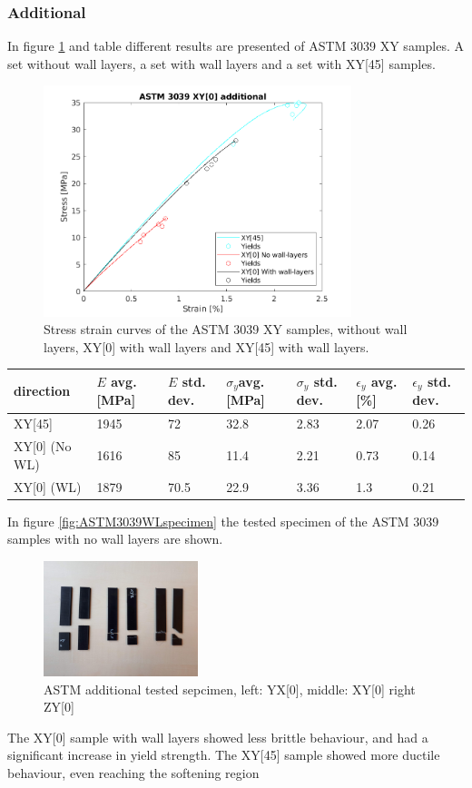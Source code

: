 \subsubsection{Additional} 
In figure \ref{fig:ASTM3039WLresults} and table \label{tab:additionalresults} different results are presented of ASTM 3039 XY samples. A set without wall layers, a set with wall layers and a set with XY[45] samples.
\begin{figure}[H]
    \centering
    \includegraphics[width=0.80\textwidth]{chapter_5_Experimentaltesting/figures/ASTMWLTensiletests.png}
    \caption{Stress strain curves of the ASTM 3039 XY samples, without wall layers, XY[0] with wall layers and XY[45] with wall layers.}
    \label{fig:ASTM3039WLresults}
\end{figure}
\begin{tabular}{ |p{2.5cm}||p{1cm}|p{1cm}|p{1cm}|p{1cm}|p{1cm}|p{1cm}|  }
 \hline
direction & $E$ avg. [MPa] & $E$ std. dev. & $\sigma_y$avg. [MPa] & $\sigma_y$ std. dev. & $\epsilon_y$ avg. [\%] & $\epsilon_y$   std. dev. \\
 \hline
XY[45] & 1945 & 72 & 32.8 & 2.83 & 2.07 & 0.26 \\
XY[0] (No WL) & 1616 & 85 & 11.4 & 2.21 & 0.73 & 0.14 \\
XY[0] (WL)& 1879 & 70.5 & 22.9 & 3.36 & 1.3 & 0.21\\
 \hline
\end{tabular}
     \label{tab:additionalresults}

In figure \ref{fig:ASTM3039WLspecimen} the tested specimen of the ASTM 3039 samples with no wall layers are shown.
\begin{figure}[H]
    \centering
    \includegraphics[width=0.40\textwidth]{chapter_5_Experimentaltesting/figures/imageASTMadd.jpg}
    \caption{ASTM additional tested sepcimen, left: YX[0], middle: XY[0] right ZY[0]}
    \label{fig:ASTM3039addspecimen}
\end{figure}
The XY[0] sample with wall layers showed less brittle behaviour, and had a significant increase in yield strength. The XY[45] sample showed  more ductile behaviour, even reaching the softening region
